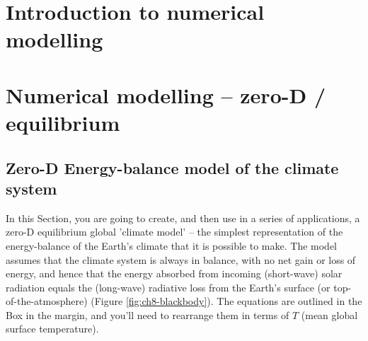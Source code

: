 \documentclass{tufte-book} %
\begin{document}
\mainmatter


\chapter{Introduction to numerical modelling}
\label{ch:01}


\newpage





\chapter{Numerical modelling -- zero-D / equilibrium}
\label{ch:02}


\newpage


\section{Zero-D Energy-balance model of the climate system}

In this Section, you are going to create, and then use in a series of applications, a zero-D equilibrium global 'climate model' --  the  simplest representation of the energy-balance   of the Earth's climate that it is possible to make. The model assumes that the climate system is always in balance, with no net gain or loss of energy, and hence that the energy absorbed from incoming (short-wave) solar radiation equals the (long-wave) radiative loss from the Earth's surface (or top-of-the-atmosphere) (Figure \ref{fig:ch8-blackbody}). The equations are outlined in the Box in the margin, and you'll need to rearrange them in terms of \(T\) (mean global surface temperature).
\end{document}
